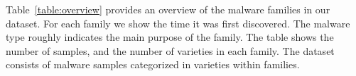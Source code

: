 Table~\ref{table:overview} provides an overview of the malware families in our dataset. 
For each family we show the time it was first discovered.
The malware type roughly indicates the main purpose of the family.
The table shows the number of samples, and the number of varieties in each family.
The dataset consists of \samsize malware samples categorized 
in \versize varieties within \fsize families.


